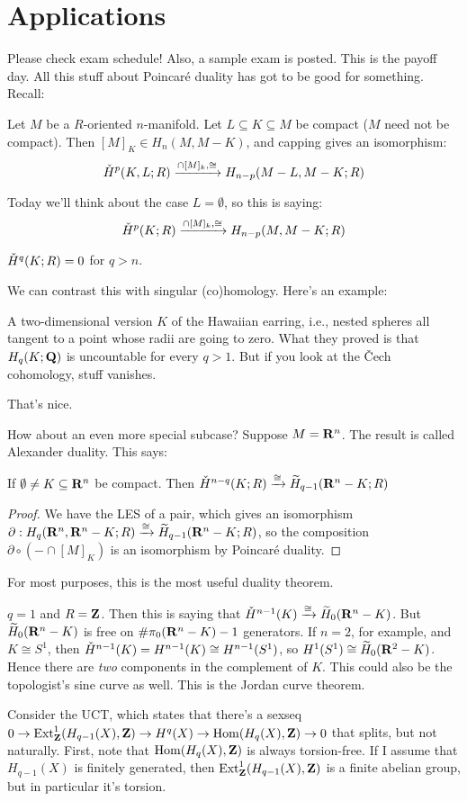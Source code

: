 \section{Applications}
Please check exam schedule! Also, a sample exam is posted. This is the payoff day. All this stuff about Poincar\'e duality has got to be good for something. Recall:
\begin{theorem}
Let $M$ be a $R$-oriented $n$-manifold. Let $L\subseteq K\subseteq M$ be compact ($M$ need not be compact). Then $[M]_K\in H_n(M,M-K)$, and capping gives an isomorphism:
$$\check{H}^p(K,L;R)\xrightarrow{\cap[M]_k,\cong}H_{n-p}(M-L,M-K;R)$$
\end{theorem}
Today we'll think about the case $L=\emptyset$, so this is saying:
$$\check{H}^p(K;R)\xrightarrow{\cap[M]_k,\cong}H_{n-p}(M,M-K;R)$$
\begin{corollary}
$\check{H}^q(K;R)=0$ for $q>n$.
\end{corollary}
We can contrast this with singular (co)homology. Here's an example:
\begin{example}
A two-dimensional version $K$ of the Hawaiian earring, i.e., nested spheres all tangent to a point whose radii are going to zero. What they proved is that $H_q(K;\mathbf Q)$ is uncountable for every $q>1$. But if you look at the \v{C}ech cohomology, stuff vanishes.
\end{example}
That's nice.

How about an even more special subcase? Suppose $M=\mathbf R^n$. The result is called Alexander duality. This says:
\begin{theorem}
If $\emptyset\neq K\subseteq \mathbf R^n$ be compact. Then $\check{H}^{n-q}(K;R)\xrightarrow{\cong}\widetilde{H}_{q-1}(\mathbf R^n-K;R)$
\end{theorem}
\begin{proof}
We have the LES of a pair, which gives an isomorphism $\partial:H_q(\mathbf R^n,\mathbf R^n-K;R)\xrightarrow{\cong}\widetilde{H}_{q-1}(\mathbf R^n-K;R)$, so the composition $\partial\circ(-\cap[M]_K)$ is an isomorphism by Poincar\'e duality.
\end{proof}
For most purposes, this is the most useful duality theorem.
\begin{example}
$q=1$ and $R=\mathbf Z$. Then this is saying that $\check{H}^{n-1}(K)\xrightarrow{\cong}\widetilde{H}_0(\mathbf R^n-K)$. But $\widetilde{H}_0(\mathbf R^n-K)$ is free on $\#\pi_0(\mathbf R^n-K)-1$ generators. If $n=2$, for example, and $K\cong S^1$, then $\check{H}^{n-1}(K)=H^{n-1}(K)\cong H^{n-1}(S^1)$, so $H^1(S^1)\cong \widetilde{H}_0(\mathbf R^2-K)$. Hence there are \emph{two} components in the complement of $K$. This could also be the topologist's sine curve as well. This is the Jordan curve theorem.
\end{example}
Consider the UCT, which states that there's a sexseq $0\to\operatorname{Ext}^1_\mathbf Z(H_{q-1}(X),\mathbf Z)\to H^q(X)\to\operatorname{Hom}(H_q(X),\mathbf Z)\to 0$ that splits, but not naturally. First, note that $\operatorname{Hom}(H_q(X),\mathbf Z)$ is always torsion-free. If I assume that $H_{q-1}(X)$ is finitely generated, then $\operatorname{Ext}^1_\mathbf Z(H_{q-1}(X),\mathbf Z)$ is a finite abelian group, but in particular it's torsion.

